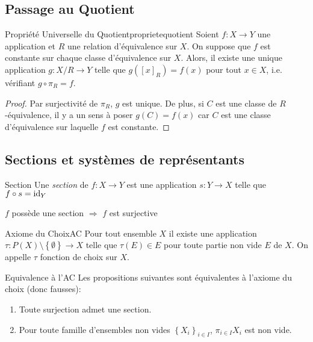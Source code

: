\documentclass{cours}
\begin{document}
\subsection{Passage au Quotient}
\begin{théorème}{Propriété Universelle du Quotient}{proprietequotient}
    Soient $f : X \rightarrow Y$ une application et $R$ une relation d'équivalence sur $X$. On suppose que $f$ est constante sur chaque classe d'équivalence sur $X$. Alors, il existe une unique application $g : X/R \rightarrow Y$ telle que $g\left(\left[x\right]_{R}\right) = f(x)$ pour tout $x \in X$, i.e. vérifiant $g \circ \pi_{R} = f$.
\end{théorème}
\begin{proof}
    Par surjectivité de $\pi_{R}$, $g$ est unique. De plus, si $C$ est une classe de $R$-équivalence, il y a un sens à poser $g(C) = f(x)$ car $C$ est une classe d'équivalence sur laquelle $f$ est constante.
\end{proof}

\subsection{Sections et systèmes de représentants}
\begin{définition}{Section}{}
    Une \emph{section} de $f : X \rightarrow Y$ est une application $s : Y \rightarrow X$ telle que $f \circ s = \textmd{id}_{Y}$
\end{définition}
\begin{propositionfr}{}{}
    $f$ possède une section $\Rightarrow$ $f$ est surjective
\end{propositionfr}

\begin{définition}{Axiome du Choix}{AC}
    Pour tout ensemble $X$ il existe une application $\tau : P(X) \setminus \left\{\emptyset\right\} \rightarrow X$ telle que $\tau(E) \in E$ pour toute partie non vide $E$ de $X$. On appelle $\tau$ fonction de choix sur $X$.
\end{définition}

\begin{propositionfr}{Equivalence à l'AC}{}
    Les propositions suivantes sont équivalentes à l'axiome du choix (donc fausses):
    \begin{enumerate}
        \item Toute surjection admet une section.
        \item Pour toute famille d'ensembles non vides $\left\{X_{i}\right\}_{i\in I}$, $\pi_{i\in I}X_{i}$ est non vide.
    \end{enumerate}
\end{propositionfr}
\end{document}
